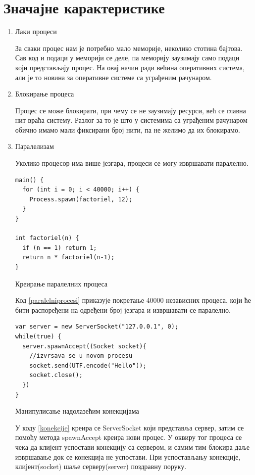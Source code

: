 \documentclass[12pt,oneside]{memoir}
\begin{document}
\section{Значајне карактеристике}
\begin{enumerate} 
\item Лаки процеси

За сваки процес нам је потребно мало меморије, неколико стотина бајтова. Сав код и подаци у меморији се деле, па меморију заузимају само подаци који представљају процес. На овај начин ради већина оперативних система, али је то новина за оперативне системе са уграђеним рачунаром.

\item Блокирање процеса

Процес се може блокирати, при чему се не заузимају ресурси, већ се главна нит враћа систему. Разлог за то је што у системима са уграђеним рачунаром обично имамо мали фиксирани број нити, па не желимо да их блокирамо. 

\item Паралелизам

Уколико процесор има више језгара, процеси се могу извршавати паралелно.

\begin{listing}
\centering
\begin{verbatim}
main() {
  for (int i = 0; i < 40000; i++) {
    Process.spawn(factoriel, 12);
  }
}

int factoriel(n) {
  if (n == 1) return 1;
  return n * factoriel(n-1);
}
\end{verbatim}
\caption{Креирање паралелних процеса}
\label{paralelniprocesi}
\end{listing}

Код \ref{paralelniprocesi} приказује покретање 40000 независних процеса, који ће бити распоређени на одређени број језгара и извршавати се паралелно.

\begin{listing}
\begin{verbatim}
var server = new ServerSocket("127.0.0.1", 0);
while(true) {
  server.spawnAccept((Socket socket){
	//izvrsava se u novom procesu
	socket.send(UTF.encode("Hello"));
	socket.close();
  })
}
\end{verbatim}
\caption{Манипулисање надолазећим конекцијама}
\label{konekcije}
\end{listing}

У коду \ref{konekcije} креира се ServerSocket који представља сервер, затим се помоћу метода spawnAccept креира нови процес. У оквиру тог процеса се чека да клијент успостави конекцију са сервером, и самим тим блокира даље извршавање док се конекција не успостави. При успостављању конекције, клијент(socket) шаље серверу(server) поздравну поруку.


\end{enumerate}
\end{document}

